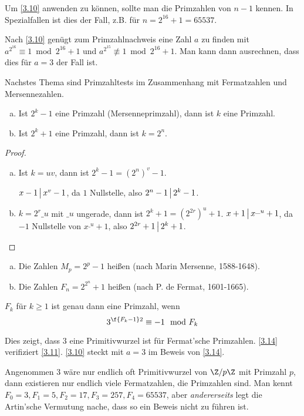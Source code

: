 \begin{nt} \label{3.11}
	Um \ref{3.10} anwenden zu können, sollte man die Primzahlen von $n-1$ kennen.
	In Spezialfallen ist dies der Fall, z.B. für $n = 2^{16} + 1 = 65537$.

	Nach \ref{3.10} genügt zum Primzahlnachweis eine Zahl $a$ zu finden mit $a^{2^{16}} \equiv 1 \bmod 2^{16} + 1$ und $a^{2^{15}} \not\equiv 1 \bmod 2^{16} + 1$.
	Man kann dann ausrechnen, dass dies für $a = 3$ der Fall ist.
\end{nt}

Nachstes Thema sind Primzahltests im Zusammenhang mit Fermatzahlen und Mersennezahlen.

\begin{lem} \label{3.12}
	\begin{enumerate}[a)]
		\item
			Ist $2^k - 1$ eine Primzahl (Mersenneprimzahl), dann ist $k$ eine Primzahl.
		\item
			Ist $2^k + 1$ eine Primzahl, dann ist $k = 2^n$.
	\end{enumerate}
	\begin{proof}
		\begin{enumerate}[a)]
			\item
				Ist $k = uv$, dann ist $2^k - 1 = (2^n)^v - 1$.

				$x-1 \divs x^v - 1$, da $1$ Nullstelle, also $2^n -1 \divs 2^k - 1$.
			\item
				$k = 2^r \_ u$ mit $\_ u$ ungerade, dann ist $2^k + 1 = (2^{2r})^u + 1$.
				$x + 1 \divs x^{\_ u} + 1$, da $-1$ Nullstelle von $x^{\_ u} + 1$, also $2^{2r} + 1 \divs 2^k + 1$.
		\end{enumerate}
	\end{proof}
\end{lem}

\begin{df} \label{3.13}
	\begin{enumerate}[a)]
		\item
			Die Zahlen $M_p = 2^p - 1$ heißen  (nach Marin Mersenne, 1588-1648).
		\item
			Die Zahlen $F_n = 2^{2^n} + 1$ heißen  (nach P. de Fermat, 1601-1665).
	\end{enumerate}
\end{df}

\begin{st} \label{3.14}
	$F_k$ für $k \ge 1$ ist genau dann eine Primzahl, wenn
	\[
		3^{\f{F_k - 1}2} \equiv -1 \mod F_k
	\]
	\begin{note}
		Dies zeigt, dass $3$ eine Primitivwurzel ist für Fermat'sche Primzahlen.
		\ref{3.14} verifiziert \ref{3.11}.
		\ref{3.10} steckt mit $a = 3$ im Beweis von \ref{3.14}.

		Angenommen $3$ wäre nur endlich oft Primitivwurzel von $\Z / p\Z$ mit Primzahl $p$, dann existieren nur endlich viele Fermatzahlen, die Primzahlen sind.
		Man kennt $F_0 = 3, F_1 = 5, F_2 = 17, F_3 = 257, F_4 = 65537$, aber \emph{andererseits} legt die Artin'sche Vermutung nache, dass so ein Beweis nicht zu führen ist.
	\end{note}
\end{st}
